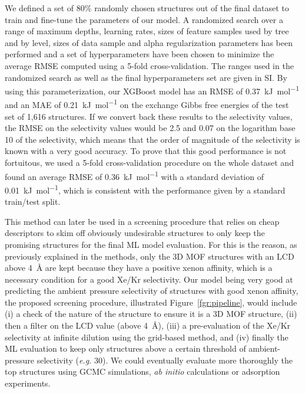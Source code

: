 \documentclass[main]{subfiles}
\begin{document}
We defined a set of {80\%} randomly chosen structures out of the final dataset to train and fine-tune the parameters of our model. A randomized search over a range of maximum depths, learning rates, sizes of feature samples used by tree and by level, sizes of data sample and alpha regularization parameters has been performed and a set of hyperparameters have been chosen to minimize the average RMSE computed using a 5-fold cross-validation. The ranges used in the randomized search as well as the final hyperparameters set are given in SI. By using this parameterization, our XGBoost model has an RMSE of \SI{0.37}{\kilo\joule\per\mole} and an MAE of \SI{0.21}{\kilo\joule\per\mole} on the exchange Gibbs free energies of the test set of 1,616 structures. If we convert back these results to the selectivity values, the RMSE on the selectivity values would be 2.5 and 0.07 on the logarithm base 10 of the selectivity, which means that the order of magnitude of the selectivity is known with a very good accuracy. To prove that this good performance is not fortuitous, we used a 5-fold cross-validation procedure on the whole dataset and found an average RMSE of \SI{0.36}{\kilo\joule\per\mole} with a standard deviation of \SI{0.01}{\kilo\joule\per\mole}, which is consistent with the performance given by a standard train/test split.

This method can later be used in a screening procedure that relies on cheap descriptors to skim off obviously undesirable structures to only keep the promising structures for the final ML model evaluation. For this is the reason, as previously explained in the methods, only the 3D MOF structures with an LCD above \SI{4}{\angstrom} are kept because they have a positive xenon affinity, which is a necessary condition for a good Xe/Kr selectivity. Our model being very good at predicting the ambient pressure selectivity of structures with good xenon affinity, the proposed screening procedure, illustrated Figure~\ref{fgr:pipeline}, would include (i) a check of the nature of the structure to ensure it is a 3D MOF structure, (ii) then a filter on the LCD value (above \SI{4}{\angstrom}), (iii) a pre-evaluation of the Xe/Kr selectivity at infinite dilution using the grid-based method, and (iv) finally the ML evaluation to keep only structures above a certain threshold of ambient-pressure selectivity (\emph{e.g.} 30). We could eventually evaluate more thoroughly the top structures using GCMC simulations, \emph{ab initio} calculations or adsorption experiments.
\end{document}
